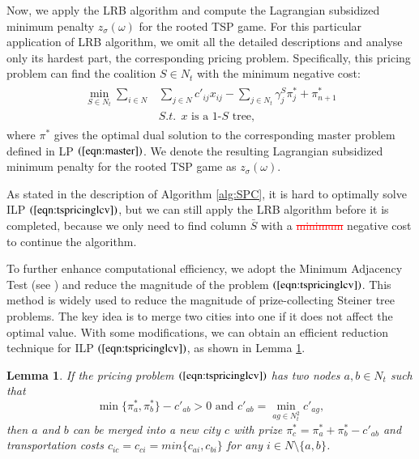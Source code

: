 \documentclass[authoryear,review,12pt]{elsarticle}
\newtheorem{lemma}{Lemma}
\begin{document}
Now, we apply the LRB algorithm and compute the Lagrangian subsidized minimum penalty $z_{\sigma}(\omega)$ for the rooted TSP game.
For this particular application of LRB algorithm, we omit all the detailed descriptions and analyse only its hardest part, the corresponding pricing problem.
Specifically, this pricing problem can find the coalition $S \in N_t$ with the minimum negative cost:
\begin{eqnarray}\label{eqn:tspricinglcv}
\begin{aligned}
\min_{S \in N_t} \sum_{i \in N} &\sum_{j \in N} c'_{ij}x_{ij} - \sum_{j \in N_t} \gamma_j^S \pi_j^* + \pi_{n+1}^*\\
&S.t.~~\text{$x$ is a 1-$S$ tree},
\end{aligned}
\end{eqnarray}
where $\pi^*$ gives the optimal dual solution to the corresponding master problem defined in LP $(\ref{eqn:master})$. We denote the resulting Lagrangian subsidized minimum penalty for the rooted TSP game as $z_{\sigma}(\omega)$.


As stated in the description of Algorithm \ref{alg:SPC}, it is hard to optimally solve ILP $(\ref{eqn:tspricinglcv})$, but we can still apply the LRB algorithm before it is completed, because we only need to find column $\bar{S}$ with a \textcolor{red}{\st{minimum}} negative cost to continue the algorithm.


To further enhance computational efficiency, we adopt the Minimum Adjacency Test (see \citealt{duin1987some,ljubic2006algorithmic}) and reduce the magnitude of the problem $(\ref{eqn:tspricinglcv})$.
This method is widely used to reduce the magnitude of prize-collecting Steiner tree problems.
The key idea is to merge two cities into one if it does not affect the optimal value. With some modifications, we can obtain an efficient reduction technique for ILP $(\ref{eqn:tspricinglcv})$, as shown in Lemma \ref{lemma:reduction}.
\begin{lemma}\label{lemma:reduction}
If the pricing problem $(\ref{eqn:tspricinglcv})$ has two nodes $a,b \in N_t$ such that
\begin{equation*}
\min \big\{ \pi_a^*, \pi_b^* \big\} - c'_{ab} >0 \text{~and~} c'_{ab} = \min_{ag \in N_t^2}c'_{ag},
\end{equation*}
then $a$ and $b$ can be merged into a new city $c$ with prize $\pi_c^* = \pi_a^* + \pi_b^* - c'_{ab}$ and transportation costs $c_{ic} = c_{ci} = min \{c_{ai}, c_{bi}\}$ for any $i \in N \setminus \{a,b\}$.
\end{lemma}
\end{document}
